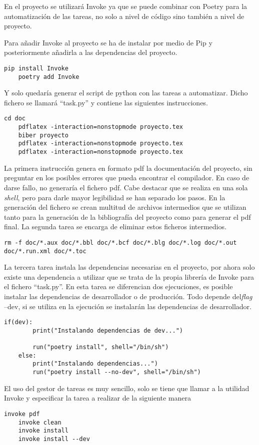 En el proyecto se utilizará Invoke ya que se puede combinar con Poetry para la automatización de las tareas, no solo a nivel de código sino también a nivel de proyecto.

Para añadir Invoke al proyecto se ha de instalar por medio de Pip y posteriormente añadirla a las dependencias del proyecto.
\begin{lstlisting}[style=consola]
	pip install Invoke
	poetry add Invoke
\end{lstlisting}

Y solo quedaría generar el script de python con las tareas a automatizar. Dicho fichero se llamará ``task.py'' y contiene las siguientes instrucciones. 

\begin{lstlisting}[style=consola]
	cd doc
	pdflatex -interaction=nonstopmode proyecto.tex
	biber proyecto
	pdflatex -interaction=nonstopmode proyecto.tex
	pdflatex -interaction=nonstopmode proyecto.tex
\end{lstlisting}
La primera instrucción genera en formato pdf la documentación del proyecto, sin preguntar en los posibles errores que pueda encontrar el compilador. En caso de darse fallo, no generaría el fichero pdf. Cabe destacar que se realiza en una sola \emph{shell}, pero para darle mayor legibilidad se han separado los pasos. En la generación del fichero se crean multitud de archivos intermedios que se utilizan tanto para la generación de la bibliografía del proyecto como para generar el pdf final. La segunda tarea se encarga de eliminar estos ficheros intermedios.

\begin{lstlisting}[style=consola]
	rm -f doc/*.aux doc/*.bbl doc/*.bcf doc/*.blg doc/*.log doc/*.out doc/*.run.xml doc/*.toc
\end{lstlisting}

La tercera tarea instala las dependencias necesarias en el proyecto, por ahora solo existe una dependencia a utilizar que se trata de la propia librería de Invoke para el fichero ``task.py''. En esta tarea se diferencian dos ejecuciones, es posible instalar las dependencias de desarrollador o de producción. Todo depende del\emph{flag} --dev, si se utiliza en la ejecución se instalarán las dependencias de desarrollador.
\begin{lstlisting}[style=consola]
	if(dev):
		print("Instalando dependencias de dev...")
		
		run("poetry install", shell="/bin/sh")
	else:
		print("Instalando dependencias...")
		run("poetry install --no-dev", shell="/bin/sh")
\end{lstlisting}

El uso del gestor de tareas es muy sencillo, solo se tiene que llamar a la utilidad Invoke y especificar la tarea a realizar de la siguiente manera
\begin{lstlisting}[style=consola]
	invoke pdf
	invoke clean
	invoke install
	invoke install --dev
\end{lstlisting}

